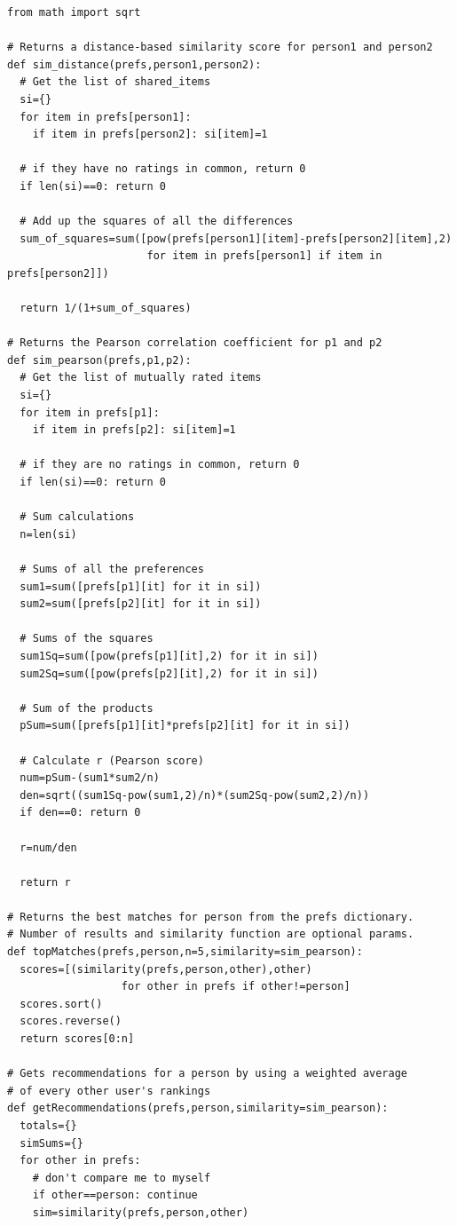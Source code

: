 \documentclass{article}
\begin{document}
\begin{lstlisting}[frame=single, caption=recommendations.py, label=recommendations]
from math import sqrt

# Returns a distance-based similarity score for person1 and person2
def sim_distance(prefs,person1,person2):
  # Get the list of shared_items
  si={}
  for item in prefs[person1]: 
    if item in prefs[person2]: si[item]=1

  # if they have no ratings in common, return 0
  if len(si)==0: return 0

  # Add up the squares of all the differences
  sum_of_squares=sum([pow(prefs[person1][item]-prefs[person2][item],2) 
                      for item in prefs[person1] if item in prefs[person2]])

  return 1/(1+sum_of_squares)

# Returns the Pearson correlation coefficient for p1 and p2
def sim_pearson(prefs,p1,p2):
  # Get the list of mutually rated items
  si={}
  for item in prefs[p1]: 
    if item in prefs[p2]: si[item]=1

  # if they are no ratings in common, return 0
  if len(si)==0: return 0

  # Sum calculations
  n=len(si)
  
  # Sums of all the preferences
  sum1=sum([prefs[p1][it] for it in si])
  sum2=sum([prefs[p2][it] for it in si])
  
  # Sums of the squares
  sum1Sq=sum([pow(prefs[p1][it],2) for it in si])
  sum2Sq=sum([pow(prefs[p2][it],2) for it in si])	
  
  # Sum of the products
  pSum=sum([prefs[p1][it]*prefs[p2][it] for it in si])
  
  # Calculate r (Pearson score)
  num=pSum-(sum1*sum2/n)
  den=sqrt((sum1Sq-pow(sum1,2)/n)*(sum2Sq-pow(sum2,2)/n))
  if den==0: return 0

  r=num/den

  return r

# Returns the best matches for person from the prefs dictionary. 
# Number of results and similarity function are optional params.
def topMatches(prefs,person,n=5,similarity=sim_pearson):
  scores=[(similarity(prefs,person,other),other) 
                  for other in prefs if other!=person]
  scores.sort()
  scores.reverse()
  return scores[0:n]

# Gets recommendations for a person by using a weighted average
# of every other user's rankings
def getRecommendations(prefs,person,similarity=sim_pearson):
  totals={}
  simSums={}
  for other in prefs:
    # don't compare me to myself
    if other==person: continue
    sim=similarity(prefs,person,other)


\end{lstlisting}
\end{document}
